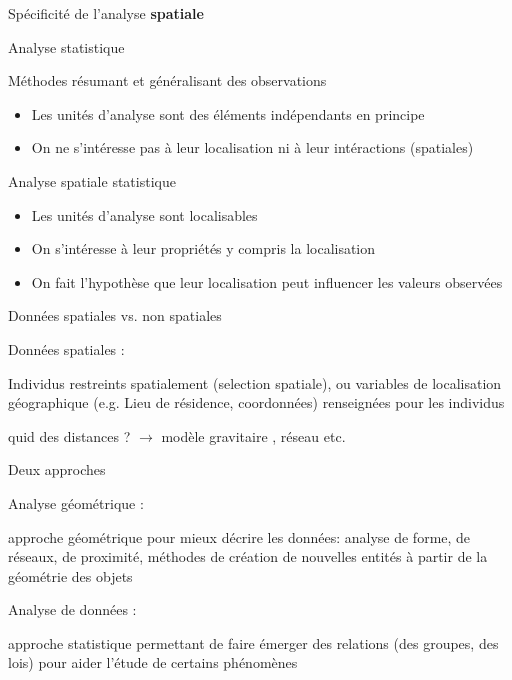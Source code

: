 \documentclass{beamer}
\begin{document}
\begin{frame}{ Spécificité de l'analyse \textbf{spatiale}}

\begin{block}{Analyse statistique}

Méthodes \alert{résumant} et \alert{généralisant} des observations
\begin{itemize}	
\item Les unités d’analyse sont des éléments indépendants en principe 
\item On ne s’intéresse pas à leur localisation ni à leur intéractions (spatiales)
\end{itemize}
\end{block}
\vfill
\begin{block}{Analyse \alert{spatiale} statistique} 
\begin{itemize}
  \item Les unités d’analyse sont localisables 
  \item On s’intéresse à leur propriétés y compris la localisation
  \item On fait l’hypothèse que leur localisation peut influencer les valeurs observées
\end{itemize}
\end{block}

\end{frame}


\begin{frame}{Données spatiales vs. non spatiales }

Données spatiales :
  
  Individus restreints spatialement (\alert{selection spatiale}), ou variables de \alert{localisation} géographique (e.g. Lieu de résidence, coordonnées) renseignées pour les individus 
  
  
  
  quid des \alert{distances} ? $\rightarrow$ modèle gravitaire , réseau etc.

\end{frame}


\begin{frame}{Deux approches} 
\begin{block}{Analyse géométrique :} 

approche \alert{géométrique} pour mieux décrire les données: analyse de forme, de réseaux, de proximité, méthodes de création de nouvelles entités à partir de la géométrie des objets
\end{block}
\vfill
\begin{block}{Analyse de données  :} 

approche \alert{statistique} permettant de faire émerger des relations (des groupes, des lois)  pour aider  l’étude de certains phénomènes
\end{block}
\end{frame}
\end{document}
